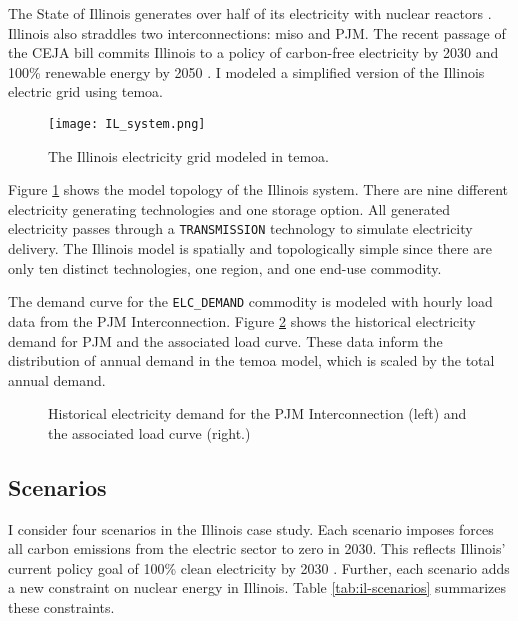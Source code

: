 The State of Illinois generates over half of its electricity with nuclear reactors
\cite{energy_information_administration_eia_nodate}.
Illinois also straddles two interconnections: \gls{miso} and PJM. The recent
passage of the CEJA bill commits Illinois to a policy of carbon-free electricity
by 2030 and 100\% renewable energy by 2050 \cite{harmon_climate_2021}.
I modeled a simplified version of the Illinois electric grid using \gls{temoa}.

\begin{figure}[H]
  \centering
  \texttt{[image: IL\_system.png]}
  \caption{The Illinois electricity grid modeled in \gls{temoa}.}
  \label{fig:ilsys}
\end{figure}

Figure \ref{fig:ilsys} shows the model topology of the Illinois system. There
are nine different electricity generating technologies and one storage option.
All generated electricity passes through a \texttt{TRANSMISSION} technology
to simulate electricity delivery. The Illinois model is spatially and topologically
simple since there are only ten distinct technologies, one region, and one
end-use commodity.

The demand curve for the \texttt{ELC\_DEMAND} commodity is modeled with hourly load
data from the PJM Interconnection. Figure \ref{fig:pjm-elc} shows the historical
electricity demand for PJM and the associated load curve. These data inform the
distribution of annual demand in the \gls{temoa} model, which is scaled by the
total annual demand.

\begin{figure}[H]
  \centering
  \resizebox{\columnwidth}{!}{}
  \caption{Historical electricity demand for the PJM Interconnection (left) and
  the associated load curve (right.)}
  \label{fig:pjm-elc}
\end{figure}

\subsection{Scenarios}
I consider four scenarios in the Illinois case study. Each scenario imposes forces
all carbon emissions from the electric sector to zero in 2030. This reflects Illinois'
current policy goal of 100\% clean electricity by 2030 \cite{office_of_governor_jb_pritzker_gov_2021}.
Further, each scenario adds a new constraint on nuclear energy in Illinois. Table
\ref{tab:il-scenarios} summarizes these constraints.

